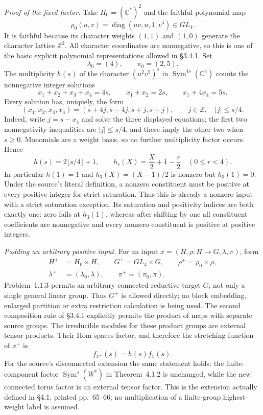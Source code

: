 \emph{Proof of the fixed factor.}
Take $H_0=(\mathbb C^*)^2$ and the faithful polynomial map
\[
 \rho_0(u,v)=\operatorname{diag}(uv,u,1,v^4)\in GL_4.
\]
It is faithful because its character weights $(1,1)$ and $(1,0)$
generate the character lattice $\mathbb Z^2$.  All character
coordinates are nonnegative, so this is one of the basic explicit
polynomial representations allowed in \S3.4.1.  Set
\[
          \lambda_0=(4),\qquad \pi_0=(2,5).
                                                        \tag{P-F63b}
\]
The multiplicity $h(s)$ of the character $(u^2v^5)^s$ in
$\operatorname{Sym}^{4s}(\mathbb C^4)$ counts the nonnegative
integer solutions
\[
 x_1+x_2+x_3+x_4=4s,\qquad
 x_1+x_2=2s,\qquad x_1+4x_4=5s.
                                                        \tag{P-F63c}
\]
Every solution has, uniquely, the form
\[
 (x_1,x_2,x_3,x_4)=(s+4j,s-4j,s+j,s-j),
 \qquad j\in\mathbb Z,\quad |j|\le s/4.
                                                        \tag{P-F63d}
\]
Indeed, write $j=s-x_4$ and solve the three displayed equations;
the first two nonnegativity inequalities are $|j|\le s/4$,
and these imply the other two when $s\ge0$.
Monomials are a weight basis, so no further multiplicity factor
occurs.  Hence
\[
 h(s)=2\lfloor s/4\rfloor+1,
 \qquad h_r(X)=\frac X2+1-\frac r2\quad(0\le r<4).
                                                        \tag{P-F63e}
\]
In particular $h(1)=1$ and $h_3(X)=(X-1)/2$ is nonzero but
$h_3(1)=0$.  Under the source's literal definition, a nonzero
constituent must be positive at every positive integer for strict
saturation.  Thus this is already a nonzero input with a strict
saturation exception.  Its saturation and positivity indices
are both exactly one: zero fails at $h_3(1)$, whereas after
shifting by one all constituent coefficients are nonnegative
and every nonzero constituent is positive at positive integers.

\emph{Padding an arbitrary positive input.}
For an input $x=(H,\rho:H\to G,\lambda,\pi)$, form
\[
 \begin{split}
 H^+&=H_0\times H,\qquad G^+=GL_4\times G,\qquad
 \rho^+=\rho_0\times\rho,\\
 \lambda^+&=(\lambda_0,\lambda),\qquad
 \pi^+=(\pi_0,\pi).
 \end{split}                                           \tag{P-F63f}
\]
Problem~1.1.3 permits an arbitrary connected reductive target
$G$, not only a single general linear group.  Thus $G^+$ is
allowed directly; no block embedding, enlarged partition or
extra restriction calculation is being used.  The second
composition rule of \S3.4.1 explicitly permits the product of
maps with separate source groups.  The irreducible modules for
these product groups are external tensor products.  Their Hom
spaces factor, and therefore the stretching function of $x^+$ is
\[
                        f_{x^+}(s)=h(s)f_x(s).          \tag{P-F63g}
\]
For the source's disconnected extension the same statement holds:
the finite-component factor $\operatorname{Sym}^s(W^*)$ in
Theorem~4.1.2 is unchanged, while the new connected torus factor
is an external tensor factor.  This is the extension actually
defined in \S4.1, printed pp.~65--66; no multiplication of a
finite-group highest-weight label is assumed.

